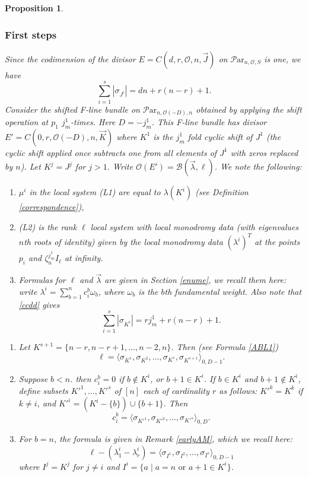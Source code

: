 \documentclass[11pt]{amsart}
\newcommand\mn{\mathcal{N}}
\newcommand\Par{\mathcal{P}\text{ar} }
\newtheorem{proposition}[theorem]{Proposition}
\numberwithin{theorem}{subsection}
\begin{document}
{\begin{proposition}
\subsubsection{First steps}\label{atonal}
 Since the codimension of the divisor
$E=C(d,r,\mathcal{O},n,\vec{J})$ on $\Par_{n,{\mathcal{O}},S}$ is one, we have
 \begin{equation}\label{ccdd}
\sum_{i=1}^s |\sigma_{J^i}|=dn +r(n-r)+1.
\end{equation}
Consider the shifted F-line bundle on $\Par_{n,\mathcal{O}(-D),n}$ obtained by applying the shift operation at $p_1$ $j^1_m$-times. Here $D=-j^1_m$. This F-line bundle has divisor  $E'=C(0,r,\mathcal{O}(-D),n,\vec{K})$ where  $K^1$ is the $j^1_m$ fold cyclic shift of $J^1$ (the cyclic shift applied once subtracts one from all elements of ${J}^1$ with zeros replaced by $n$). Let $K^j=J^j$ for $j>1$. Write $\mathcal{O}(E')= \mathcal{B}(\vec{\lambda},\ell)$.
We note the following:
\begin{enumerate}
\item [(I)]  $\mu^i$ in the local system (L1) are equal to $\lambda(K^i)$ (see Definition  \ref{correspondence}),
\item[(II)](L2) is the rank $\ell$ local system with local monodromy data (with eigenvalues $n$th roots of identity) given by the local monodromy  data $(\lambda^i)^T$ at the points $p_i$ and
$\zeta_n^{j^1_{m}}I_{\ell}$ at infinity.
\item[(III)] Formulas for  $\ell$ and $\vec{\lambda}$ are given in Section \ref{enume}, we recall them here: write
$\lambda^i=\sum_{b=1}^{n} c_{i}^{b}\omega_b$, where $\omega_b$ is the $b$th fundamental weight.
Also note that \eqref{ccdd} gives
\begin{equation}\label{cccddd}
\sum_{i=1}^s |\sigma_{K^i}|=rj^1_m +r(n-r)+1.
\end{equation}
 \end{enumerate}

\begin{enumerate}
\item[(A)] Let $K^{s+1}=\{n-r,n-r+1,\dots,n-2,n\}$. Then (see Formula \ref{ABL1})
$$\ell=\langle\sigma_{K^1}, \sigma_{K^2},\dots,\sigma_{K^s},\sigma_{K^{s+1}}\rangle_{0,D-1}.$$

\item[(B)] Suppose $b<n$. then $c_{i}^{b}=0$ if $b\not\in K^i$, or $b+1\in K^i$. If $b\in K^i$ and $b+1\not\in K^i$, define subsets $K'^1,\dots,K'^s$ of $[n]$
 each of cardinality $r$ as follows: $K'^k=K^k$ if $k\neq i$, and $K'^i=(K^i-\{b\})\cup \{b+1\}$. Then
$$c_i^{b}= \langle\sigma_{K'^1}, \sigma_{K'^2},\dots,\sigma_{K'^s}\rangle_{0,D}.$$
\item[(C)] For $b=n$, the formula is given in Remark \ref{earlyAM}, which we recall here:
$$\ell-(\lambda^i_{1}-\lambda^i_{r})=\langle\sigma_{I^1}, \sigma_{I^2},\dots,\sigma_{I^s}\rangle_{0,D-1}$$
where $I^j=K^j$ for $j\neq i$ and $I^i= \{a\mid a=n\text{ or } a+1\in K^i\}$.
\end{enumerate}

\end{proposition}}
\end{document}
